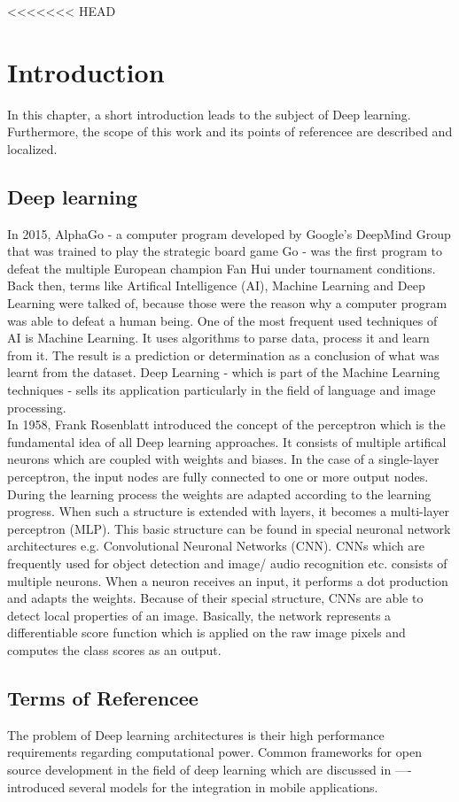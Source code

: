 <<<<<<< HEAD
\section{Introduction}
In this chapter, a short introduction leads to the subject of Deep learning. Furthermore, the scope of this work and its points of referencee are described and localized. 
	\subsection{Deep learning}
		
In 2015, AlphaGo - a computer program developed by Google's DeepMind Group that was trained to play the strategic board game Go - was the first program to defeat the multiple European champion Fan Hui under tournament conditions. Back then, terms like Artifical Intelligence (AI), Machine Learning and Deep Learning were talked of, because those were the reason why a computer program was able to defeat a human being. One of the most frequent used techniques of AI is Machine Learning. It uses algorithms to parse data, process it and learn from it. The result is a prediction or determination as a conclusion of what was learnt from the dataset. Deep Learning - which is part of the Machine Learning techniques - sells its application particularly in the field of language and image processing. \\

In 1958, Frank Rosenblatt introduced the concept of the perceptron which is the fundamental idea of all Deep learning approaches. It consists of multiple artifical neurons which are coupled with weights and biases. In the case of a single-layer perceptron, the input nodes are fully connected to one or more output nodes. During the learning process the weights are adapted according to the learning progress. When such a structure is extended with layers, it becomes a multi-layer perceptron (MLP). This basic structure can be found in special neuronal network architectures e.g. Convolutional Neuronal Networks (CNN). CNNs which are frequently used for object detection and image/ audio recognition etc. consists of multiple neurons. When a neuron receives an input, it performs a dot production and adapts the weights. Because of their special structure, CNNs are able to detect local properties of an image. Basically, the network represents a differentiable score function which is applied on the raw image pixels and computes the class scores as an output.
 
	\subsection{Terms of Referencee}
The problem of Deep learning architectures is their high performance requirements regarding computational power. Common frameworks for open source development in the field of deep learning which are discussed in ---- introduced several models for the integration in mobile applications. \\

